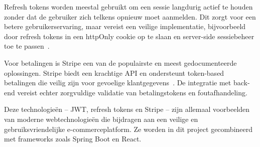 Refresh tokens worden meestal gebruikt om een sessie langdurig actief te houden zonder dat de gebruiker zich telkens opnieuw moet aanmelden. Dit zorgt voor een betere gebruikerservaring, maar vereist een veilige implementatie, bijvoorbeeld door refresh tokens in een httpOnly cookie op te slaan en server-side sessiebeheer toe te passen~\autocite{OWASP2023}.

Voor betalingen is Stripe een van de populairste en meest gedocumenteerde oplossingen. Stripe biedt een krachtige API en ondersteunt token-based betalingen die veilig zijn voor gevoelige klantgegevens~\autocite{StripeAPI}. De integratie met back-end vereist echter zorgvuldige validatie van betalingstokens en foutafhandeling.

Deze technologieën – JWT, refresh tokens en Stripe – zijn allemaal voorbeelden van moderne webtechnologieën die bijdragen aan een veilige en gebruiksvriendelijke e-commerceplatform. Ze worden in dit project gecombineerd met frameworks zoals Spring Boot en React.






